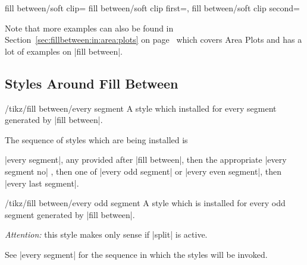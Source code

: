 \begin{tikzkeylist}{%
	fill between/soft clip=
	fill between/soft clip first=,
	fill between/soft clip second=%
}
\begin{codeexample}[]
\end{codeexample}


	Note that more examples can also be found in Section~\ref{sec:fillbetween:in:area:plots} on page~\pageref{sec:fillbetween:in:area:plots} which covers Area Plots and has a lot of examples on |fill between|.
\end{tikzkeylist}

\subsection{Styles Around Fill Between}

\begin{stylekey}{/tikz/fill between/every segment}
	A style which installed for every segment generated by |fill between|.

	The sequence of styles which are being installed is 

	|every segment|, any  provided after | fill between|, then the appropriate |every segment no| , then one of |every odd segment| or |every even segment|, then |every last segment|.
\end{stylekey}

\begin{stylekey}{/tikz/fill between/every odd segment}
	A style which is installed for every odd segment generated by |fill between|.

	\emph{Attention:} this style makes only sense if |split| is active.

	See |every segment| for the sequence in which the styles will be invoked.
\end{stylekey}

